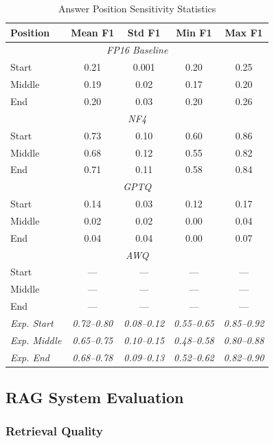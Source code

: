 \begin{table}[h]
\centering
\caption{Answer Position Sensitivity Statistics}
\label{tab:position_stats}
\begin{tabular}{@{}lcccc@{}}
\toprule
\textbf{Position} & \textbf{Mean F1} & \textbf{Std F1} & \textbf{Min F1} & \textbf{Max F1} \\
\midrule
\multicolumn{5}{c}{\textit{FP16 Baseline}} \\
\midrule
Start & 0.21 & 0.001 & 0.20 & 0.25 \\
Middle & 0.19 & 0.02 & 0.17 & 0.20 \\
End & 0.20 & 0.03 & 0.20 & 0.26 \\
\midrule
\multicolumn{5}{c}{\textit{NF4}} \\
\midrule
Start & 0.73 & 0.10 & 0.60 & 0.86 \\
Middle & 0.68 & 0.12 & 0.55 & 0.82 \\
End & 0.71 & 0.11 & 0.58 & 0.84 \\
\midrule
\multicolumn{5}{c}{\textit{GPTQ}} \\
\midrule
Start & 0.14 & 0.03 & 0.12 & 0.17 \\
Middle & 0.02 & 0.02 & 0.00 & 0.04 \\
End & 0.04 & 0.04 & 0.00 & 0.07 \\
\midrule
\multicolumn{5}{c}{\textit{AWQ}} \\
\midrule
Start & --- & --- & --- & --- \\
Middle & --- & --- & --- & --- \\
End & --- & --- & --- & --- \\
\midrule
\textit{Exp. Start} & \textit{0.72--0.80} & \textit{0.08--0.12} & \textit{0.55--0.65} & \textit{0.85--0.92} \\
\textit{Exp. Middle} & \textit{0.65--0.75} & \textit{0.10--0.15} & \textit{0.48--0.58} & \textit{0.80--0.88} \\
\textit{Exp. End} & \textit{0.68--0.78} & \textit{0.09--0.13} & \textit{0.52--0.62} & \textit{0.82--0.90} \\
\bottomrule
\end{tabular}
\end{table}

\newpage
\subsection{RAG System Evaluation}

\subsubsection{Retrieval Quality}


